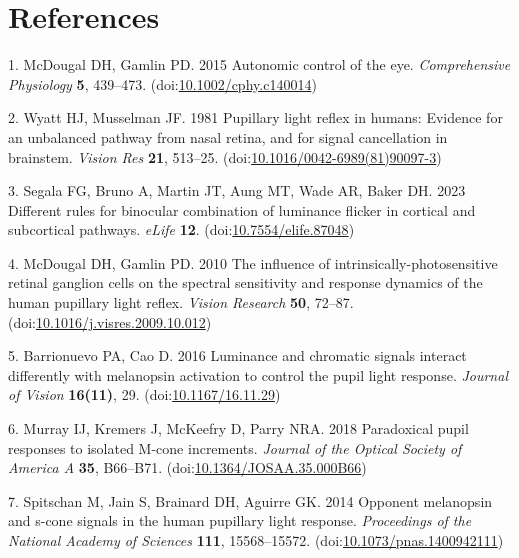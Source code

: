 \documentclass[
]{article}
\begin{document}
\hypertarget{references}{%
\section{References}\label{references}}

\hypertarget{refs}{}
\leavevmode\hypertarget{ref-McDougal2015}{}%
1. McDougal DH, Gamlin PD. 2015 Autonomic control of the eye. \emph{Comprehensive Physiology} \textbf{5}, 439--473. (doi:\href{https://doi.org/10.1002/cphy.c140014}{10.1002/cphy.c140014})

\leavevmode\hypertarget{ref-Wyatt1981}{}%
2. Wyatt HJ, Musselman JF. 1981 Pupillary light reflex in humans: Evidence for an unbalanced pathway from nasal retina, and for signal cancellation in brainstem. \emph{Vision Res} \textbf{21}, 513--25. (doi:\href{https://doi.org/10.1016/0042-6989(81)90097-3}{10.1016/0042-6989(81)90097-3})

\leavevmode\hypertarget{ref-Segala2023}{}%
3. Segala FG, Bruno A, Martin JT, Aung MT, Wade AR, Baker DH. 2023 Different rules for binocular combination of luminance flicker in cortical and subcortical pathways. \emph{eLife} \textbf{12}. (doi:\href{https://doi.org/10.7554/elife.87048}{10.7554/elife.87048})

\leavevmode\hypertarget{ref-McDougal2010}{}%
4. McDougal DH, Gamlin PD. 2010 The influence of intrinsically-photosensitive retinal ganglion cells on the spectral sensitivity and response dynamics of the human pupillary light reflex. \emph{Vision Research} \textbf{50}, 72--87. (doi:\href{https://doi.org/10.1016/j.visres.2009.10.012}{10.1016/j.visres.2009.10.012})

\leavevmode\hypertarget{ref-Barrionuevo2016}{}%
5. Barrionuevo PA, Cao D. 2016 Luminance and chromatic signals interact differently with melanopsin activation to control the pupil light response. \emph{Journal of Vision} \textbf{16(11)}, 29. (doi:\href{https://doi.org/10.1167/16.11.29}{10.1167/16.11.29})

\leavevmode\hypertarget{ref-Murray2018}{}%
6. Murray IJ, Kremers J, McKeefry D, Parry NRA. 2018 Paradoxical pupil responses to isolated M-cone increments. \emph{Journal of the Optical Society of America A} \textbf{35}, B66--B71. (doi:\href{https://doi.org/10.1364/JOSAA.35.000B66}{10.1364/JOSAA.35.000B66})

\leavevmode\hypertarget{ref-Spitschan2014}{}%
7. Spitschan M, Jain S, Brainard DH, Aguirre GK. 2014 Opponent melanopsin and s-cone signals in the human pupillary light response. \emph{Proceedings of the National Academy of Sciences} \textbf{111}, 15568--15572. (doi:\href{https://doi.org/10.1073/pnas.1400942111}{10.1073/pnas.1400942111})
\end{document}
